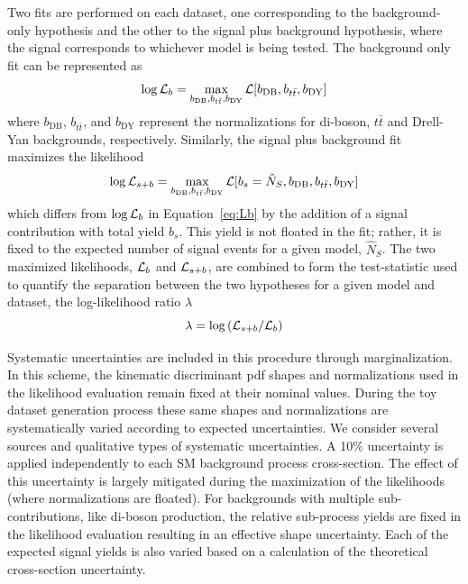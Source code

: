 Two fits are performed on each dataset, one corresponding to the background-only hypothesis and the other to the signal plus background hypothesis, where the signal corresponds to whichever model is being tested. The background only fit can be represented as
\begin{equation}
\log {\cal L}_{b} = \max_{b_{\mathrm{DB}},b_{t\bar{t}},b_{\mathrm{DY}}} {\cal L} [b_{\mathrm{DB}},b_{t\bar{t}},b_{\mathrm{DY}}]
\label{eq:Lb}
\end{equation}
where $b_{\mathrm{DB}}$, $b_{t\bar{t}}$, and $b_{\mathrm{DY}}$ represent the normalizations for di-boson, $t\bar{t}$ and Drell-Yan backgrounds, respectively. Similarly, the signal plus background fit maximizes the likelihood
\begin{equation}
\log {\cal L}_{s+b} = \max_{b_{\mathrm{DB}},b_{t\bar{t}},b_{\mathrm{DY}}} {\cal L} [b_{s} = \hat{N}_{S},b_{\mathrm{DB}},b_{t\bar{t}},b_{\mathrm{DY}}]
\label{eq:Lspb}
\end{equation}
which differs from $\log {\cal L}_{b}$ in Equation~\eqref{eq:Lb} by the addition of a signal contribution with total yield $b_{s}$. This yield is not floated in the fit; rather, it is fixed to the expected number of signal events for a given model, $\hat{N}_{S}$. The two maximized likelihoods, ${\cal L}_{b}$ and ${\cal L}_{s+b}$, are combined to form the test-statistic used to quantify the separation between the two hypotheses for a given model and dataset, the log-likelihood ratio $\lambda$
\begin{equation}
\lambda = \log \left( {\cal L}_{s+b} / {\cal L}_{b} \right)
\end{equation}

Systematic uncertainties are included in this procedure through marginalization. In this scheme, the kinematic discriminant pdf shapes and normalizations used in the likelihood evaluation remain fixed at their nominal values. During the toy dataset generation process these same shapes and normalizations are systematically varied according to expected uncertainties. We consider several sources and qualitative types of systematic uncertainties. A 10\% uncertainty is applied independently to each SM background process cross-section. The effect of this uncertainty is largely mitigated during the maximization of the likelihoods (where normalizations are floated). For backgrounds with multiple sub-contributions, like di-boson production, the relative sub-process yields are fixed in the likelihood evaluation resulting in an effective shape uncertainty. Each of the expected signal yields is also varied based on a calculation of the theoretical cross-section uncertainty. 

